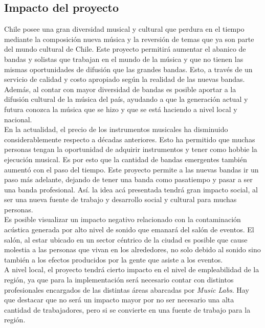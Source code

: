 \subsection{Impacto del proyecto}

Chile posee una gran diversidad musical y 
cultural que perdura en el tiempo mediante la 
composición nueva música y la reversión de 
temas que ya son parte del mundo cultural 
de Chile. Este proyecto permitirá aumentar 
el abanico de bandas y solistas que trabajan 
en el mundo de la música y que no tienen 
las mismas oportunidades de difusión que 
las grandes bandas. Esto, a través de un 
servicio de calidad y costo apropiado según 
la realidad de las nuevas bandas. Además, al
contar con mayor diversidad de bandas es posible
aportar a la difusión cultural de la música
del país, ayudando a que la generación actual
y futura conozca la música que se hizo y que
se está haciendo a nivel local y nacional.\\ %

En la actualidad, el precio de los instrumentos 
musicales ha disminuido considerablemente respecto 
a décadas anteriores. Esto ha permitido que muchas 
personas tengan la oportunidad de adquirir instrumentos 
y tener como hobbie la ejecución musical. Es por esto 
que la cantidad de bandas emergentes también aumentó 
con el paso del tiempo. Este proyecto permite a las 
nuevas bandas ir un paso más adelante, dejando de 
tener una banda como pasatiempo y pasar a ser 
una banda profesional. Así. la idea acá presentada 
tendrá gran impacto social, al ser una nueva 
fuente de trabajo y desarrollo social y cultural 
para muchas personas.\\ %

Es posible visualizar un impacto negativo %
relacionado con la contaminación acústica
generada por alto nivel de sonido que emanará
del salón de eventos. El salón, al estar
ubicado en un sector céntrico de la ciudad
es posible que cause molestia a las personas
que vivan en los alrededores, no solo debido
al sonido sino también a los efectos producidos
por la gente que asiste a los eventos.\\

A nivel local, el proyecto tendrá cierto impacto
en el nivel de empleabilidad de la región, ya que
para la implementación será necesario contar con
distintos profesionales encargados de las distintas
áreas abarcadas por \emph{Music Labs}. Hay que destacar
que no será un impacto mayor por no ser necesario una
alta cantidad de trabajadores, pero si se convierte
en una fuente de trabajo para la región.
